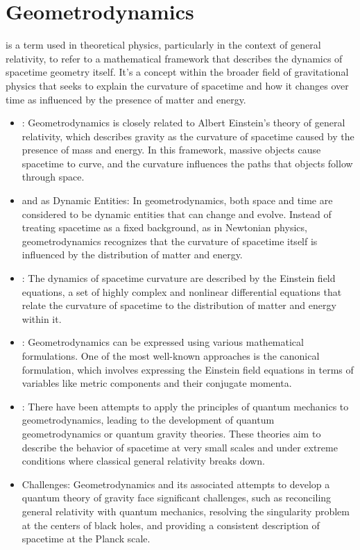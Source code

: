 \chapter{Geometrodynamics}
\thispagestyle{fancy}

 is a term used in theoretical physics, particularly in the context of general relativity, to refer to a mathematical framework that describes the dynamics of spacetime geometry itself. It's a concept within the broader field of gravitational physics that seeks to explain the curvature of spacetime and how it changes over time as influenced by the presence of matter and energy.

\begin{itemize}
	\item {}: Geometrodynamics is closely related to Albert Einstein's theory of general relativity, which describes gravity as the curvature of spacetime caused by the presence of mass and energy. In this framework, massive objects cause spacetime to curve, and the curvature influences the paths that objects follow through space.

	\item {} and  as Dynamic Entities: In geometrodynamics, both space and time are considered to be dynamic entities that can change and evolve. Instead of treating spacetime as a fixed background, as in Newtonian physics, geometrodynamics recognizes that the curvature of spacetime itself is influenced by the distribution of matter and energy.

	\item {}: The dynamics of spacetime curvature are described by the Einstein field equations, a set of highly complex and nonlinear differential equations that relate the curvature of spacetime to the distribution of matter and energy within it.

	\item {}: Geometrodynamics can be expressed using various mathematical formulations. One of the most well-known approaches is the canonical formulation, which involves expressing the Einstein field equations in terms of variables like metric components and their conjugate momenta.

	\item {}: There have been attempts to apply the principles of quantum mechanics to geometrodynamics, leading to the development of quantum geometrodynamics or quantum gravity theories. These theories aim to describe the behavior of spacetime at very small scales and under extreme conditions where classical general relativity breaks down.

	\item Challenges: Geometrodynamics and its associated attempts to develop a quantum theory of gravity face significant challenges, such as reconciling general relativity with quantum mechanics, resolving the singularity problem at the centers of black holes, and providing a consistent description of spacetime at the Planck scale.
\end{itemize}

